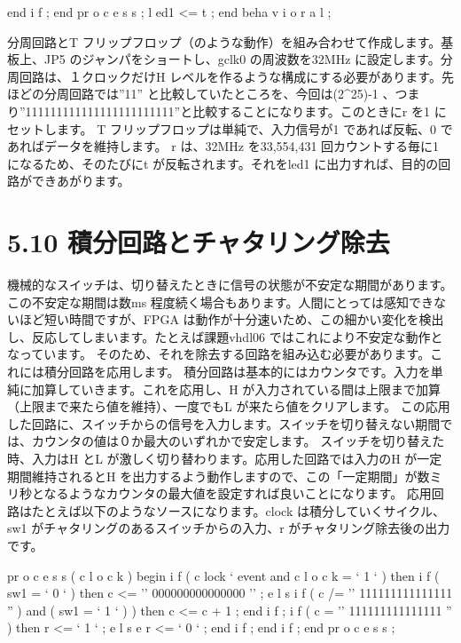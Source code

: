\documentclass[letterpaper,10pt,dvipdfmx]{sphinxmanual}
\begin{document}
end i f ;
end pr o c e s s ;
l ed1 \textless{}= t ;
end beha v i o r a l ;

分周回路とT フリップフロップ（のような動作）を組み合わせて作成します。基板上、JP5 のジャンパをショートし、gclk0 の周波数を32MHz に設定します。分周回路は、１クロックだけH レベルを作るような構成にする必要があります。先ほどの分周回路では''11'' と比較していたところを、今回は(2\textasciicircum{}25)-1 、つまり''111111111111111111111111''と比較することになります。このときにr を1 にセットします。
T フリップフロップは単純で、入力信号が1 であれば反転、0 であればデータを維持します。
r は、32MHz を33,554,431 回カウントする毎に1 になるため、そのたびにt が反転されます。それをled1 に出力すれば、目的の回路ができあがります。


\section{5.10 積分回路とチャタリング除去}
\label{05_try:id17}
機械的なスイッチは、切り替えたときに信号の状態が不安定な期間があります。
この不安定な期間は数ms 程度続く場合もあります。人間にとっては感知できないほど短い時間ですが、FPGA は動作が十分速いため、この細かい変化を検出し、反応してしまいます。たとえば課題vhdl06 ではこれにより不安定な動作となっています。
そのため、それを除去する回路を組み込む必要があります。これには積分回路を応用します。
積分回路は基本的にはカウンタです。入力を単純に加算していきます。これを応用し、H が入力されている間は上限まで加算（上限まで来たら値を維持）、一度でもL が来たら値をクリアします。
この応用した回路に、スイッチからの信号を入力します。スイッチを切り替えない期間では、カウンタの値は０か最大のいずれかで安定します。
スイッチを切り替えた時、入力はH とL が激しく切り替わります。応用した回路では入力のH が一定期間維持されるとH を出力するよう動作しますので、この「一定期間」が数ミリ秒となるようなカウンタの最大値を設定すれば良いことになります。
応用回路はたとえば以下のようなソースになります。clock は積分していくサイクル、sw1 がチャタリングのあるスイッチからの入力、r がチャタリング除去後の出力です。

pr o c e s s ( c l o c k )
begin
i f ( c lock ` event and c l o c k = ` 1 ` ) then
i f ( sw1 = ` 0 ` ) then
c \textless{}= '' 000000000000000 '' ;
e l s i f ( c /= '' 111111111111111 '' ) and ( sw1 = ` 1 ` ) ) then
c \textless{}= c + 1 ;
end i f ;
i f ( c = '' 111111111111111 '' ) then
r \textless{}= ` 1 ` ;
e l s e
r \textless{}= ` 0 ` ;
end i f ;
end i f ;
end pr o c e s s ;
\end{document}
